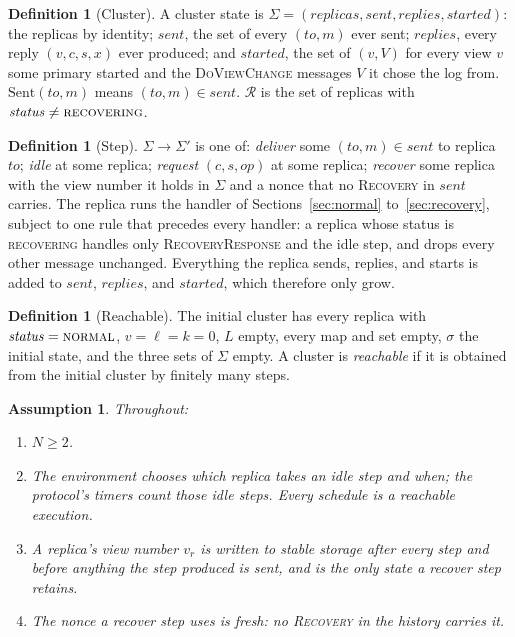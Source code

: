\documentclass[11pt,a4paper]{article}
\theoremstyle{plain}
\newtheorem{assumption}[theorem]{Assumption}
\theoremstyle{definition}
\newtheorem{definition}[theorem]{Definition}
\theoremstyle{remark}
\newcommand{\msg}[1]{\textsc{#1}}
\newcommand{\dvc}{\msg{DoViewChange}}
\newcommand{\Sent}{\mathrm{Sent}}
\newcommand{\sent}{\mathit{sent}}
\newcommand{\started}{\mathit{started}}
\newcommand{\status}{\mathit{status}}
\newcommand{\normal}{\textsc{normal}}
\newcommand{\recovering}{\textsc{recovering}}
\begin{document}
\begin{definition}[Cluster]
\label{def:cluster}
A cluster state is $\Sigma = (\mathit{replicas}, \sent, \mathit{replies},
\started)$: the replicas by identity; $\sent$, the set of every
$(\mathit{to}, m)$ ever sent; $\mathit{replies}$, every reply
$(v, c, s, x)$ ever produced; and $\started$, the set of $(v, V)$ for
every view $v$ some primary started and the \dvc{} messages $V$ it
chose the log from. $\Sent(\mathit{to}, m)$ means $(\mathit{to}, m) \in \sent$.
$\mathcal{R}$ is the set of replicas with $\status \ne \recovering$.
\end{definition}

\begin{definition}[Step]
\label{def:step}
$\Sigma \to \Sigma'$ is one of: \emph{deliver} some $(\mathit{to}, m) \in
\sent$ to replica $\mathit{to}$; \emph{idle} at some replica; \emph{request}
$(c, s, \mathit{op})$ at some replica; \emph{recover} some replica with
the view number it holds in $\Sigma$ and a nonce that no \msg{Recovery}
in $\sent$ carries. The replica runs the handler of
Sections~\ref{sec:normal} to~\ref{sec:recovery}, subject to one rule
that precedes every handler: a replica whose status is \recovering{}
handles only \msg{RecoveryResponse} and the idle step, and drops every
other message unchanged. Everything the replica sends, replies, and
starts is added to $\sent$, $\mathit{replies}$, and $\started$, which
therefore only grow.
\end{definition}

\begin{definition}[Reachable]
\label{def:reachable}
The initial cluster has every replica with $\status = \normal$,
$v = \ell = k = 0$, $L$ empty, every map and set empty, $\sigma$ the
initial state, and the three sets of $\Sigma$ empty. A cluster is
\emph{reachable} if it is obtained from the initial cluster by finitely
many steps.
\end{definition}

\begin{assumption}
\label{asm:model}
Throughout:
\begin{enumerate}[nosep,label=(\roman*)]
  \item $N \ge 2$.
  \item The environment chooses which replica takes an idle step and
    when; the protocol's timers count those idle steps. Every schedule is
    a reachable execution.
  \item A replica's view number $v_r$ is written to stable storage after
    every step and before anything the step produced is sent, and is the
    only state a \emph{recover} step retains.
  \item The nonce a \emph{recover} step uses is fresh: no \msg{Recovery}
    in the history carries it.
\end{enumerate}
\end{assumption}
\end{document}
